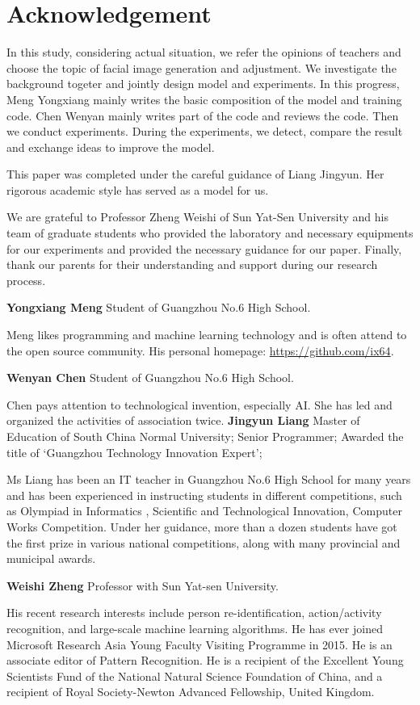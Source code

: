 \section*{Acknowledgement}

In this study, considering actual situation, we refer the opinions of teachers and choose the topic of facial image generation and adjustment. We investigate the background togeter and jointly design model and experiments. In this progress, Meng Yongxiang mainly writes the basic composition of the model and training code. Chen Wenyan mainly writes part of the code and reviews the code. Then we conduct experiments. During the experiments, we detect, compare the result and exchange ideas to improve the model.

This paper was completed under the careful guidance of Liang Jingyun. Her rigorous academic style has served as a model for us.

We are grateful to Professor Zheng Weishi of Sun Yat-Sen University and his team of graduate students who provided the laboratory and necessary equipments for our experiments and provided the necessary guidance for our paper.
Finally, thank our parents for their understanding and support during our research process.

\vspace{4ex}


\textbf{Yongxiang Meng}  Student of Guangzhou No.6 High School.

Meng likes programming and machine learning technology and is often attend to the open source community. His personal homepage: \url{https://github.com/ix64}.


\textbf{Wenyan Chen}  Student of Guangzhou No.6 High School.

Chen pays attention to technological invention, especially AI. She has led and organized the activities of association twice. 
\textbf{Jingyun Liang}  Master of Education of South China Normal University;
Senior Programmer;
Awarded the title of ‘Guangzhou Technology Innovation Expert’;

Ms Liang has been an IT teacher in Guangzhou No.6 High School for many years and has been experienced in instructing students in different competitions, such as Olympiad in Informatics , Scientific and Technological Innovation, Computer Works Competition. Under her guidance, more than a dozen students have got the first prize in various national competitions, along with many provincial and municipal awards.


\textbf{Weishi Zheng}  Professor with Sun Yat-sen University.

His recent research interests include person re-identification, action/activity recognition, and large-scale machine learning algorithms.
He has ever joined Microsoft Research Asia Young Faculty Visiting Programme in 2015.
He is an associate editor of Pattern Recognition.
He is a recipient of the Excellent Young Scientists Fund of the National Natural Science Foundation of China,
    and a recipient of Royal Society-Newton Advanced Fellowship, United Kingdom.

